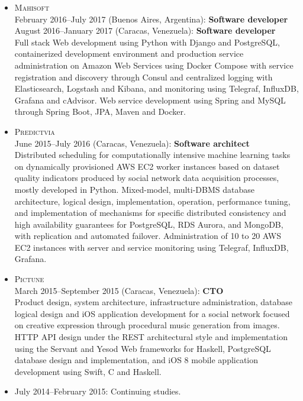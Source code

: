 \documentclass{res}
\begin{document}
\begin{resume}
\begin{itemize}[leftmargin=-0.3in]
    \item
      \textsc{Mahisoft}
      \\ February 2016--July 2017 (Buenos Aires, Argentina): \textbf{Software developer}
      \\ August 2016--January 2017 (Caracas, Venezuela): \textbf{Software developer}
      \\ \small{Full stack Web development using Python with Django and PostgreSQL, containerized development environment and production service administration on Amazon Web Services using Docker Compose with service registration and discovery through Consul and centralized logging with Elasticsearch, Logstash and Kibana, and monitoring using Telegraf, InfluxDB, Grafana and cAdvisor.  Web service development using Spring and MySQL through Spring Boot, JPA, Maven and Docker.}

    \item
      \textsc{Predictvia}
      \\ June 2015--July 2016 (Caracas, Venezuela): \textbf{Software architect}
      \\ \small{Distributed scheduling for computationally intensive machine learning tasks on dynamically provisioned AWS EC2 worker instances based on dataset quality indicators produced by social network data acquisition processes, mostly developed in Python.  Mixed-model, multi-DBMS database architecture, logical design, implementation, operation, performance tuning, and implementation of mechanisms for specific distributed consistency and high availability guarantees for PostgreSQL, RDS Aurora, and MongoDB, with replication and automated failover.  Administration of 10 to 20 AWS EC2 instances with server and service monitoring using Telegraf, InfluxDB, Grafana.}

    \item
      \textsc{Pictune}
      \\ March 2015--September 2015 (Caracas, Venezuela): \textbf{CTO}
      \\ \small{Product design, system architecture, infrastructure administration, database logical design and iOS application development for a social network focused on creative expression through procedural music generation from images.  HTTP API design under the REST architectural style and implementation using the Servant and Yesod Web frameworks for Haskell, PostgreSQL database design and implementation, and iOS 8 mobile application development using Swift, C and Haskell.}

    \item July 2014--February 2015: Continuing studies.


\end{itemize}
\end{resume}
\end{document}
